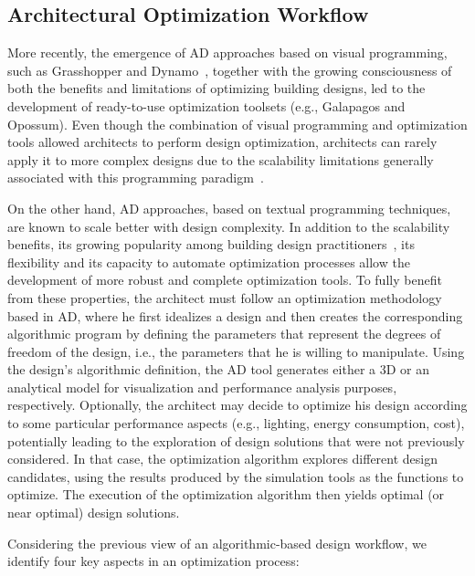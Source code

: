 \subsection{Architectural Optimization Workflow}
\label{ssec:AOW}
More recently, the emergence of \ac{AD} approaches based on visual programming, such as Grasshopper and Dynamo~\cite{GRASSHOPPER,DYNAMOBIM}, together with the growing consciousness of both the benefits and limitations of optimizing building designs, led to the development of ready-to-use optimization toolsets (e.g., Galapagos and Opossum). Even though the combination of visual programming and optimization tools allowed architects to perform design optimization, architects can rarely apply it to more complex designs due to the scalability limitations generally associated with this programming paradigm~\cite{Heijden2015}.

On the other hand, \ac{AD} approaches, based on textual programming techniques, are known to scale better with design complexity. In addition to the scalability benefits, its growing popularity among building design practitioners~\cite{Kestelier2013}, its flexibility and its capacity to automate optimization processes allow the development of more robust and complete optimization tools. To fully benefit from these properties, the architect must follow an optimization methodology based in \ac{AD}, where he first idealizes a design and then creates the corresponding algorithmic program by defining the parameters that represent the degrees of freedom of the design, i.e., the parameters that he is willing to manipulate. Using the design's algorithmic definition, the \ac{AD} tool generates either a 3D or an analytical model for visualization and performance analysis purposes, respectively. Optionally, the architect may decide to optimize his design according to some particular performance aspects (e.g., lighting, energy consumption, cost), potentially leading to the exploration of design solutions that were not previously considered. In that case, the optimization algorithm explores different design candidates, using the results produced by the simulation tools as the functions to optimize. The execution of the optimization algorithm then yields optimal (or near optimal) design solutions.

Considering the previous view of an algorithmic-based design workflow, we identify four key aspects in an optimization process:

